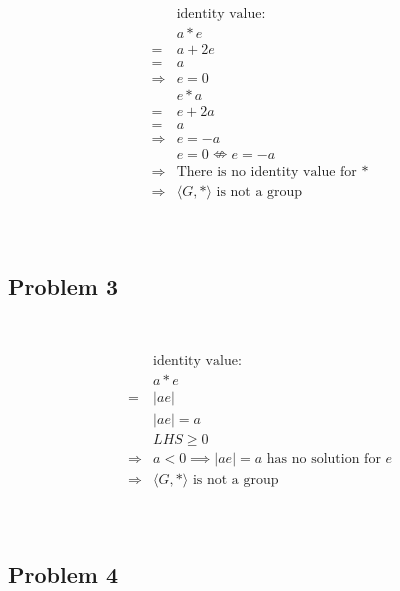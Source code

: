 \documentclass{article}
\begin{document}
~

\begin{equation*}
    \begin{split}
        &\text{identity value}:\\
        &a*e\\
        =&a+2e\\
        =&a\\
        \Rightarrow&e=0\\
        &e*a\\
        =&e+2a\\
        =&a\\
        \Rightarrow&e=-a\\
        &e=0\nLeftrightarrow  e=-a\\
        \Rightarrow&\text{There is no identity value for }*\\
        \Rightarrow&\langle G,*\rangle\text{ is not a group}\\
    \end{split}
\end{equation*}

~

\subsection*{Problem 3}

~

\begin{equation*}
    \begin{split}
        &\text{identity value}:\\
        &a*e\\
        =&|ae|\\
        &|ae|=a\\
        &LHS\geqslant0\\
        \Rightarrow&a<0\implies |ae|=a\text{ has no solution for }e\\
        \Rightarrow&\langle G,*\rangle\text{ is not a group}\\
    \end{split}
\end{equation*}

~

\subsection*{Problem 4}

~
\end{document}
